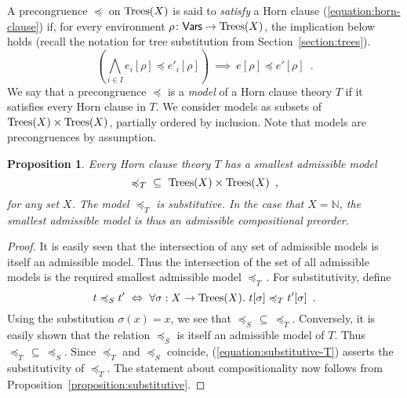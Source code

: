 \documentclass[a4paper,UKenglish]{lipics-v2018}
\newcommand{\Trees}{\textnormal{Trees}}
\newcommand{\Basicleq}{\preccurlyeq}
\newcommand{\Vars}{\mathsf{Vars}}
\theoremstyle{plain}
\newtheorem{proposition}[theorem]{Proposition}
\begin{document}
A precongruence $\Basicleq$ on $\Trees(X)$ is said to \emph{satisfy} a Horn clause (\ref{equation:horn-clause}) if,
for every environment $\rho \colon \Vars \to \Trees(X)$, the implication below holds (recall the notation for tree substitution from Section~\ref{section:trees}).
\[
\left( \bigwedge_{i \in I} e_i[\rho] \Basicleq e'_i[\rho] \right) ~ \implies ~  e[\rho] \Basicleq e'[\rho] \enspace .
\]
We say that a precongruence $\Basicleq$ is a \emph{model} of a Horn clause theory $T$ if it satisfies every Horn clause in $T$.
We consider models as subsets of $\Trees(X) \times \Trees(X)$, partially ordered by inclusion. Note that models are precongruences by assumption.
\begin{proposition}
\label{proposition:axiomatic}
Every Horn clause theory $T$ has a smallest admissible model  
\[{\Basicleq_T} ~\subseteq~ \Trees(X) \times \Trees(X) \enspace ,\]
for any set $X$. The model ${\Basicleq_T}$
is substitutive. In the case that $X = \mathbb{N}$, the smallest admissible model is thus an
admissible compositional preorder.
\end{proposition}
\begin{proof}
It is easily seen that the intersection of any set of admissible models is itself an admissible model.
Thus the
intersection of the set of all admissible models is the required smallest admissible model $\Basicleq_T\,$. For substitutivity, 
define 
\begin{equation}
\label{equation:substitutive-T}
t \Basicleq_S t' ~ \Leftrightarrow ~ \forall \sigma : X \to \Trees(X). ~ t[\sigma] \Basicleq_T t'[\sigma] \enspace .
\end{equation}
Using the substitution $\sigma(x) = x$, we see that ${\Basicleq_S}\, \subseteq\, {\Basicleq_T}$.
Conversely, it is easily shown that the relation $\Basicleq_S$ is itself an admissible model of $T$. 
Thus ${\Basicleq_T}\, \subseteq\, {\Basicleq_S}$. Since ${\Basicleq_T}$ and ${\Basicleq_S}$ coincide,
(\ref{equation:substitutive-T}) asserts the substitutivity of ${\Basicleq_T}$.
The statement about compositionality now follows from Proposition~\ref{proposition:substitutive}.
\end{proof}
\end{document}
